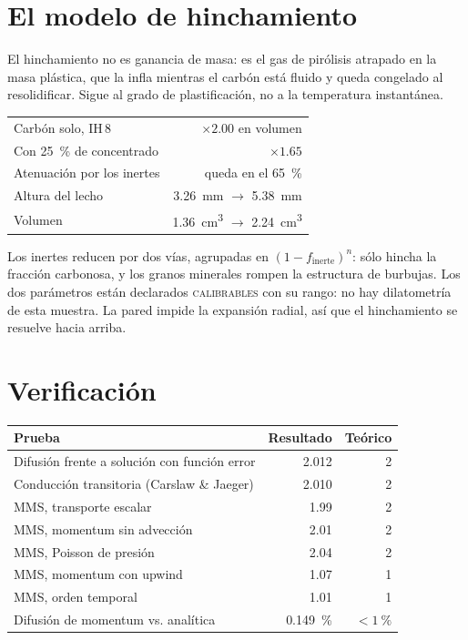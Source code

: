 \documentclass[11pt,a4paper]{article}
\begin{document}


\section{El modelo de hinchamiento}
\label{sec:hinchamiento}

El hinchamiento no es ganancia de masa: es el gas de pirólisis atrapado en la
masa plástica, que la infla mientras el carbón está fluido y queda congelado al
resolidificar. Sigue al grado de plastificación, no a la temperatura instantánea.

\begin{table}[H]
\centering
\small
\begin{tabular}{lr}
\toprule
Carbón solo, IH\,8 & $\times\num{2.00}$ en volumen \\
Con \qty{25}{\percent} de concentrado & $\mathbf{\times\num{1.65}}$ \\
Atenuación por los inertes & queda en el \qty{65}{\percent} \\
Altura del lecho & \SI{3.26}{\mm} $\rightarrow$ \SI{5.38}{\mm} \\
Volumen & \SI{1.36}{\cubic\cm} $\rightarrow$ \SI{2.24}{\cubic\cm} \\
\bottomrule
\end{tabular}
\end{table}

Los inertes reducen por dos vías, agrupadas en $(1-f_{\text{inerte}})^n$: sólo
hincha la fracción carbonosa, y los granos minerales rompen la estructura de
burbujas. Los dos parámetros están declarados \textsc{calibrables} con su rango:
no hay dilatometría de esta muestra. La pared impide la expansión radial, así que
el hinchamiento se resuelve hacia arriba.

\section{Verificación}

\begin{table}[H]
\centering
\small
\begin{tabular}{lrr}
\toprule
\textbf{Prueba} & \textbf{Resultado} & \textbf{Teórico} \\
\midrule
Difusión frente a solución con función error & \num{2.012} & 2 \\
Conducción transitoria (Carslaw \& Jaeger) & \num{2.010} & 2 \\
MMS, transporte escalar & \num{1.99} & 2 \\
MMS, momentum sin advección & \num{2.01} & 2 \\
MMS, Poisson de presión & \num{2.04} & 2 \\
MMS, momentum con upwind & \num{1.07} & 1 \\
MMS, orden temporal & \num{1.01} & 1 \\
Difusión de momentum vs. analítica & \qty{0.149}{\percent} & $<\qty{1}{\percent}$ \\
\bottomrule
\end{tabular}
\end{table}
\end{document}
